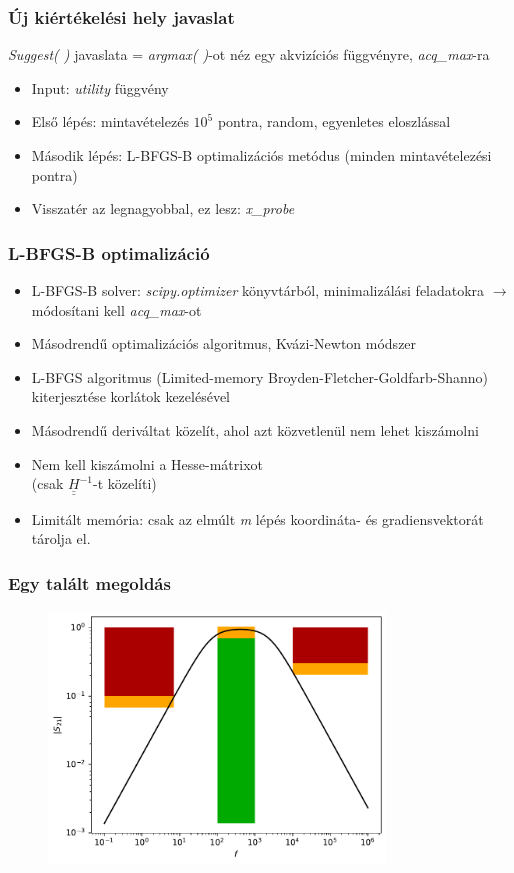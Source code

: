 \documentclass[aspectratio=43]{beamer}
\begin{document}
\begin{frame}
	\frametitle{Új kiértékelési hely javaslat}
	\textit{Suggest( )} javaslata = \textit{argmax( )}-ot néz egy akvizíciós függvényre, \textit{acq\_max}-ra
	\begin{itemize}
		\item Input: \textit{utility} függvény
		\item Első lépés: mintavételezés $10^5$ pontra, random, egyenletes eloszlással
		\item Második lépés: L-BFGS-B optimalizációs metódus (minden mintavételezési pontra)
		\item Visszatér az legnagyobbal, ez lesz: \textit{x\_probe}
	\end{itemize}
\end{frame}
\begin{frame}
	\frametitle{L-BFGS-B optimalizáció}
	\begin{itemize}
		\item L-BFGS-B solver: \textit{scipy.optimizer} könyvtárból, minimalizálási feladatokra $\rightarrow$ módosítani kell \textit{acq\_max}-ot
		\item Másodrendű optimalizációs algoritmus, Kvázi-Newton módszer
		\item L-BFGS algoritmus (Limited-memory Broyden-Fletcher-Goldfarb-Shanno) kiterjesztése korlátok kezelésével
		\item Másodrendű deriváltat közelít, ahol azt közvetlenül nem lehet kiszámolni
		\item Nem kell kiszámolni a Hesse-mátrixot\\(csak $\underline{\underline{H}}^{-1}$-t közelíti)
		\item Limitált memória: csak az elmúlt \textit{m} lépés koordináta- és gradiensvektorát tárolja el.
	\end{itemize}
\end{frame}
\begin{frame}
	\frametitle{Egy talált megoldás}
		\begin{figure}
			\centering
			\includegraphics[width=0.8\textwidth]{megoldas.pdf}
		\end{figure}
\end{frame}
\end{document}
